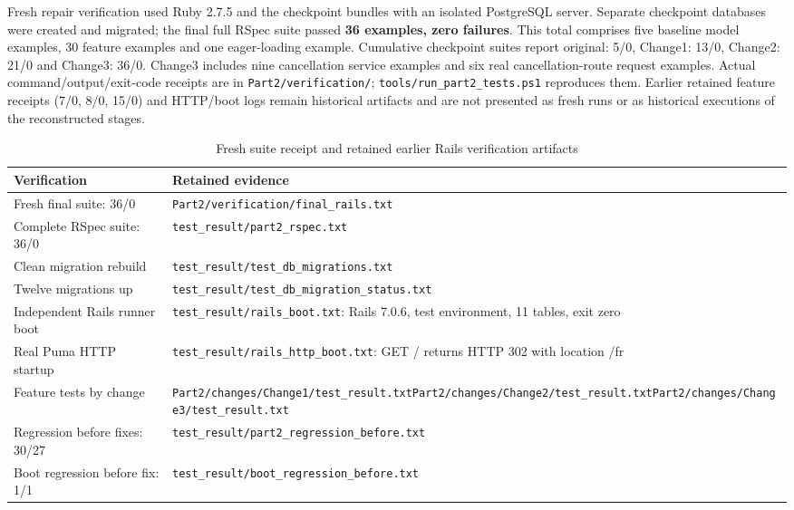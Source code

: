 \documentclass[10pt,a4paper]{article}
\newcommand{\code}[1]{\texttt{\small #1}}
\begin{document}
Fresh repair verification used Ruby 2.7.5 and the checkpoint bundles with an isolated PostgreSQL server. Separate checkpoint databases were created and migrated; the final full RSpec suite passed \textbf{36 examples, zero failures}. This total comprises five baseline model examples, 30 feature examples and one eager-loading example. Cumulative checkpoint suites report original: 5/0, Change1: 13/0, Change2: 21/0 and Change3: 36/0. Change3 includes nine cancellation service examples and six real cancellation-route request examples. Actual command/output/exit-code receipts are in \code{Part2/verification/}; \code{tools/run\_part2\_tests.ps1} reproduces them. Earlier retained feature receipts (7/0, 8/0, 15/0) and HTTP/boot logs remain historical artifacts and are not presented as fresh runs or as historical executions of the reconstructed stages.

\begin{table}[H]
\centering
\caption{Fresh suite receipt and retained earlier Rails verification artifacts}
\begin{tabularx}{\linewidth}{lX}
\toprule
Verification & Retained evidence\\
\midrule
Fresh final suite: 36/0 & \code{Part2/verification/final\_rails.txt}\\
Complete RSpec suite: 36/0 & \code{test\_result/part2\_rspec.txt}\\
Clean migration rebuild & \code{test\_result/test\_db\_migrations.txt}\\
Twelve migrations up & \code{test\_result/test\_db\_migration\_status.txt}\\
Independent Rails runner boot & \code{test\_result/rails\_boot.txt}: Rails 7.0.6, test environment, 11 tables, exit zero\\
Real Puma HTTP startup & \code{test\_result/rails\_http\_boot.txt}: GET / returns HTTP 302 with location /fr\\
Feature tests by change & \code{Part2/changes/Change1/test\_result.txt}\newline \code{Part2/changes/Change2/test\_result.txt}\newline \code{Part2/changes/Change3/test\_result.txt}\\
Regression before fixes: 30/27 & \code{test\_result/part2\_regression\_before.txt}\\
Boot regression before fix: 1/1 & \code{test\_result/boot\_regression\_before.txt}\\
\bottomrule
\end{tabularx}
\end{table}
\end{document}
